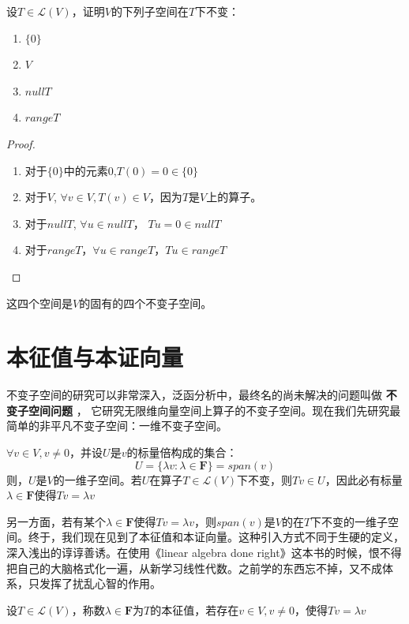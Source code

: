 \documentclass[10pt,a4paper,UTF8]{article}
\begin{document}
\begin{instance}
设\(T\in \mathcal{L}(V)\)，证明\(V\)的下列子空间在\(T\)下不变：
\begin{enumerate}
\item \(\{0\}\)
\item \(V\)
\item \(nullT\)
\item \(rangeT\)
\end{enumerate}
\end{instance}

\begin{proof}
\begin{enumerate}
\item 对于\(\{0\}\)中的元素\(0\),\(T(0) = 0 \in \{0\}\)
\item 对于\(V\), \(\forall v\in V, T(v) \in V\)，因为\(T\)是\(V\)上的算子。
\item 对于\(nullT\), \(\forall u \in nullT\)， \(Tu = 0 \in nullT\)
\item 对于\(rangeT\)，\(\forall u \in rangeT\)，\(Tu \in rangeT\)
\end{enumerate}
\end{proof}

这四个空间是\(V\)的固有的四个不变子空间。

\section{本征值与本证向量}
\label{sec:org0373068}


不变子空间的研究可以非常深入，泛函分析中，最终名的尚未解决的问题叫做 \textbf{不变子空间问题} ， 它研究无限维向量空间上算子的不变子空间。现在我们先研究最简单的非平凡不变子空间：一维不变子空间。

\(\forall v\in V, v\neq 0\)，并设\(U\)是\(v\)的标量倍构成的集合：\[U = \{\lambda v: \lambda \in \mathbf{F}\} = span(v) \]
则，\(U\)是\(V\)的一维子空间。若\(U\)在算子\(T\in \mathcal{L}(V)\)下不变，则\(Tv\in U\)，因此必有标量\(\lambda\in \mathbf{F}\)使得\(Tv = \lambda v\)

另一方面，若有某个\(\lambda \in \mathbf{F}\)使得\(Tv = \lambda v\)，则\(span(v)\)是\(V\)的在\(T\)下不变的一维子空间。终于，我们现在见到了本征值和本证向量。这种引入方式不同于生硬的定义，深入浅出的谆谆善诱。在使用《linear algebra done right》这本书的时候，恨不得把自己的大脑格式化一遍，从新学习线性代数。之前学的东西忘不掉，又不成体系，只发挥了扰乱心智的作用。

\begin{definition}
设\(T\in \mathcal{L}(V)\)，称数\(\lambda \in \mathbf{F}\)为\(T\)的本征值，若存在\(v\in V,v\neq 0\)，使得\(Tv = \lambda v\)
\end{definition}
\end{document}

